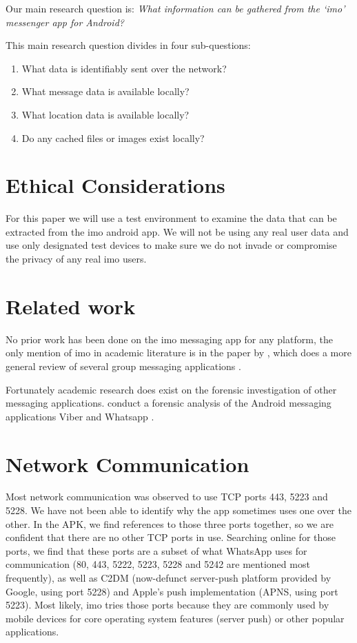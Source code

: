 \documentclass[conference]{IEEEtran}
\begin{document}
Our main research question is:
{\it What information can be gathered from the `imo' messenger app for Android?}

This main research question divides in four sub-questions:

\begin{enumerate}
    \item What data is identifiably sent over the network?
    \item What message data is available locally?
    \item What location data is available locally?
    \item Do any cached files or images exist locally?
\end{enumerate}


\section{Ethical Considerations}\label{sec:III}

For this paper we will use a test environment to examine the data that can be
extracted from the imo android app. We will not be using any real user data and
use only designated test devices to make sure we do not invade or compromise the
privacy of any real imo users.


\section{Related work}\label{sec:IV}

No prior work has been done on the imo messaging app for any platform, the only
mention of imo in academic literature is in the paper by \citeauthor{zhu}, which
does a more general review of several group messaging applications \cite{zhu}.

Fortunately academic research does exist on the forensic investigation of other
messaging applications. \citeauthor{mahajan2013forensic} conduct a forensic
analysis of the Android messaging applications Viber and Whatsapp
\cite{mahajan2013forensic}. %


\section{Network Communication}\label{sec:comm}

Most network communication was observed to use TCP ports 443, 5223 and 5228. We
have not been able to identify why the app sometimes uses one over the other.
In the APK, we find references to those three ports together, so we are
confident that there are no other TCP ports in use. Searching online for those
ports, we find that these ports are a subset of what WhatsApp uses for
communication (80, 443, 5222, 5223, 5228 and 5242 are mentioned most
frequently), as well as C2DM (now-defunct server-push platform provided by
Google, using port 5228) and Apple's push implementation (APNS, using port
5223). Most likely, imo tries those ports because they are commonly used by
mobile devices for core operating system features (server push) or other
popular applications.
\end{document}
